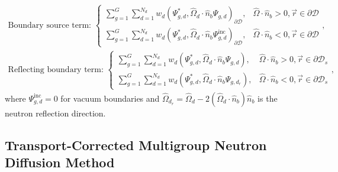 \documentclass[letterpaper]{mc2025}
\begin{document}
\begin{gather}
  \mbox{Boundary source term: }
  \begin{cases}
    \sum^G_{g=1}\sum^{N_d}_{d=1}w_d\left(\Psi^*_{g,d},
    \hat{\Omega}_d\cdot\hat{n}_b\Psi_{g,d}\right)_{\partial\mathcal{D}},
    & \hat{\Omega}\cdot\hat{n}_b>0,\vec{r}\in\partial\mathcal{D} \\
    \sum^G_{g=1}\sum^{N_d}_{d=1}w_d\left(\Psi^*_{g,d},
    \hat{\Omega}_d\cdot\hat{n}_b\Psi^\text{inc}_{g,d}\right)_{\partial\mathcal{D}},
    & \hat{\Omega}\cdot\hat{n}_b<0,\vec{r}\in\partial\mathcal{D}
  \end{cases}, \label{eq:boundary-source} \\
  \mbox{Reflecting boundary term: }
  \begin{cases}
    \sum^G_{g=1}\sum^{N_d}_{d=1}w_d\left(\Psi^*_{g,d},
    \hat{\Omega}_d\cdot\hat{n}_b\Psi_{g,d}\right),
    & \hat{\Omega}\cdot\hat{n}_b>0,\vec{r}\in\partial\mathcal{D}_s \\
    \sum^G_{g=1}\sum^{N_d}_{d=1}w_d\left(\Psi^*_{g,d},
    \hat{\Omega}_d\cdot\hat{n}_b\Psi_{g,d_r}\right),
    & \hat{\Omega}\cdot\hat{n}_b<0,\vec{r}\in\partial\mathcal{D}_s
  \end{cases}, \label{eq:reflecting-bc}
\end{gather}
%
where $\Psi^\text{inc}_{g,d}=0$ for vacuum boundaries and
$\hat{\Omega}_{d_r} = \hat{\Omega}_d - 2(\hat{\Omega}_d\cdot\hat{n}_b)\hat{n}_b$ is the neutron
reflection direction.

\subsection{Transport-Corrected Multigroup Neutron Diffusion Method} \label{sec:transport-correction}
\end{document}
